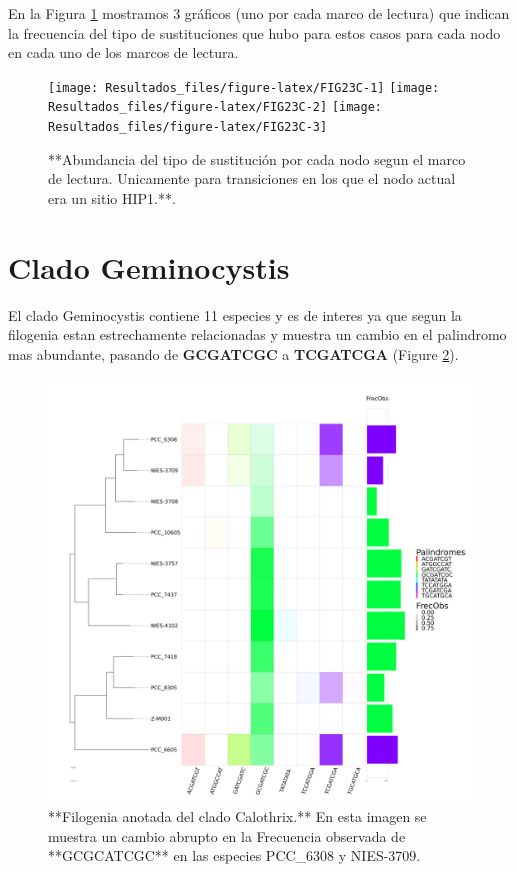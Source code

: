 \documentclass[
]{book}
\begin{document}
En la Figura \ref{fig:FIG23C} mostramos 3 gráficos (uno por cada marco de lectura) que indican la frecuencia del tipo de sustituciones que hubo para estos casos para cada nodo en cada uno de los marcos de lectura.

\begin{figure}

{\centering \texttt{[image: Resultados\_files/figure-latex/FIG23C-1]} \texttt{[image: Resultados\_files/figure-latex/FIG23C-2]} \texttt{[image: Resultados\_files/figure-latex/FIG23C-3]} 

}

\caption{**Abundancia del tipo de sustitución por cada nodo segun el marco de lectura. Unicamente para transiciones en los que el nodo actual era un sitio HIP1.**.}\label{fig:FIG23C}
\end{figure}

\hypertarget{clado-geminocystis}{%
\section{Clado Geminocystis}\label{clado-geminocystis}}

El clado Geminocystis contiene 11 especies y es de interes ya que segun la filogenia estan estrechamente relacionadas y muestra un cambio en el palindromo mas abundante, pasando de \textbf{GCGATCGC} a \textbf{TCGATCGA} (Figure \ref{fig:FIG12G}).

\begin{figure}

{\centering \includegraphics[width=1\linewidth]{Clados/Geminocystis_clade/figures/geminocystis_Octanuc_FrecObs_sel32_filogenia_HIG} 

}

\caption{**Filogenia anotada del clado Calothrix.** En esta imagen se muestra un cambio abrupto en la Frecuencia observada de **GCGCATCGC** en las especies PCC\_6308 y NIES-3709.}\label{fig:FIG12G}
\end{figure}
\end{document}
